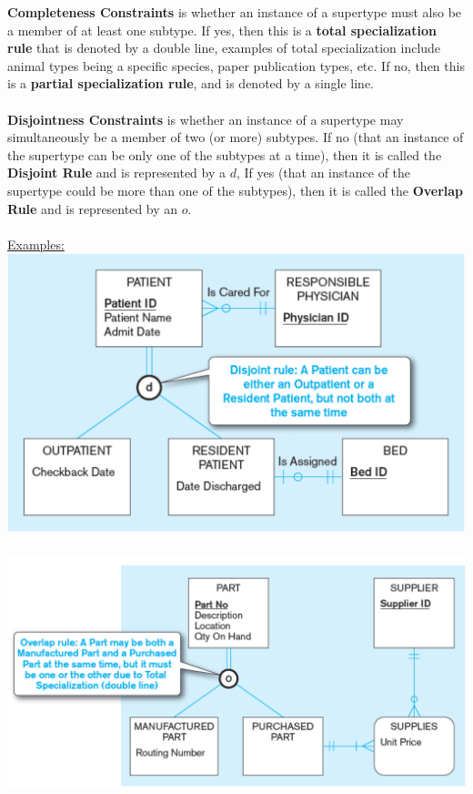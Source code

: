 \documentclass[12pt]{article}
\begin{document}
\textbf{Completeness Constraints} is whether an instance of a supertype must also be a member of at least one subtype. If yes, then this is a \textbf{total specialization rule} that is denoted by a double line, examples of total specialization include animal types being a specific species, paper publication types, etc. If no, then this is a \textbf{partial specialization rule}, and is denoted by a single line.\\
\\
\textbf{Disjointness Constraints} is whether an instance of a supertype may simultaneously be a member of two (or more) subtypes. If no (that an instance of the supertype can be only one of the subtypes at a time), then it is called the \textbf{Disjoint Rule} and is represented by a $d$, If yes (that an instance of the supertype could be more than one of the subtypes), then it is called the \textbf{Overlap Rule} and is represented by an $o$.\\
\\
\underline{Examples:}\\
\includegraphics[scale=0.5]{lec3-6}\\
\\
\includegraphics[scale=0.5]{lec3-7}
\end{document}
